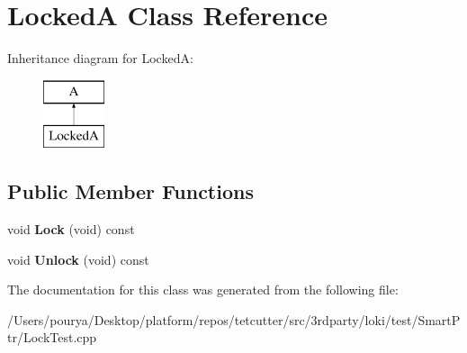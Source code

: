 \hypertarget{classLockedA}{}\section{Locked\+A Class Reference}
\label{classLockedA}
Inheritance diagram for Locked\+A\+:\begin{figure}[H]
\begin{center}
\leavevmode
\includegraphics[height=2.000000cm]{classLockedA}
\end{center}
\end{figure}
\subsection*{Public Member Functions}
\begin{DoxyCompactItemize}
\item 
\hypertarget{classLockedA_a726ec32a5b632a1d6abe3e2af6bf47f8}{}void {\bfseries Lock} (void) const \label{classLockedA_a726ec32a5b632a1d6abe3e2af6bf47f8}

\item 
\hypertarget{classLockedA_a1583f882f28cd431634caf87890669e0}{}void {\bfseries Unlock} (void) const \label{classLockedA_a1583f882f28cd431634caf87890669e0}

\end{DoxyCompactItemize}


The documentation for this class was generated from the following file\+:\begin{DoxyCompactItemize}
\item 
/\+Users/pourya/\+Desktop/platform/repos/tetcutter/src/3rdparty/loki/test/\+Smart\+Ptr/Lock\+Test.\+cpp\end{DoxyCompactItemize}
